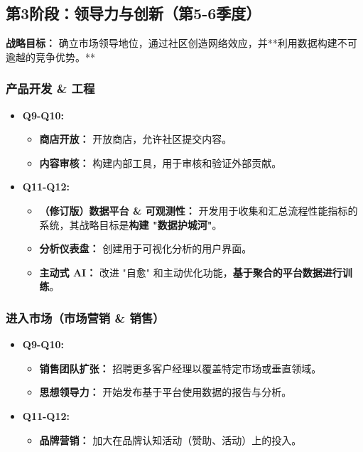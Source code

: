 \documentclass[11pt, a4paper, oneside]{article}
\begin{document}
\clearpage

\subsection{第3阶段：领导力与创新（第5-6季度）}
\textbf{战略目标：} 确立市场领导地位，通过社区创造网络效应，并**利用数据构建不可逾越的竞争优势。**

\subsubsection{产品开发 \& 工程}
\begin{itemize}[leftmargin=*]
    \item \textbf{Q9-Q10:}
    \begin{itemize}
        \item \textbf{商店开放：} 开放商店，允许社区提交内容。
        \item \textbf{内容审核：} 构建内部工具，用于审核和验证外部贡献。
    \end{itemize}
    \item \textbf{Q11-Q12:}
    \begin{itemize}
        \item \textbf{（修订版）数据平台 \& 可观测性：} 开发用于收集和汇总流程性能指标的系统，其战略目标是\textbf{构建 "数据护城河"}。
        \item \textbf{分析仪表盘：} 创建用于可视化分析的用户界面。
        \item \textbf{主动式 AI：} 改进 "自愈" 和主动优化功能，\textbf{基于聚合的平台数据进行训练}。
    \end{itemize}
\end{itemize}

\subsubsection{进入市场（市场营销 \& 销售）}
\begin{itemize}[leftmargin=*]
    \item \textbf{Q9-Q10:}
    \begin{itemize}
        \item \textbf{销售团队扩张：} 招聘更多客户经理以覆盖特定市场或垂直领域。
        \item \textbf{思想领导力：} 开始发布基于平台使用数据的报告与分析。
    \end{itemize}
    \item \textbf{Q11-Q12:}
    \begin{itemize}
        \item \textbf{品牌营销：} 加大在品牌认知活动（赞助、活动）上的投入。
    \end{itemize}
\end{itemize}
\end{document}
